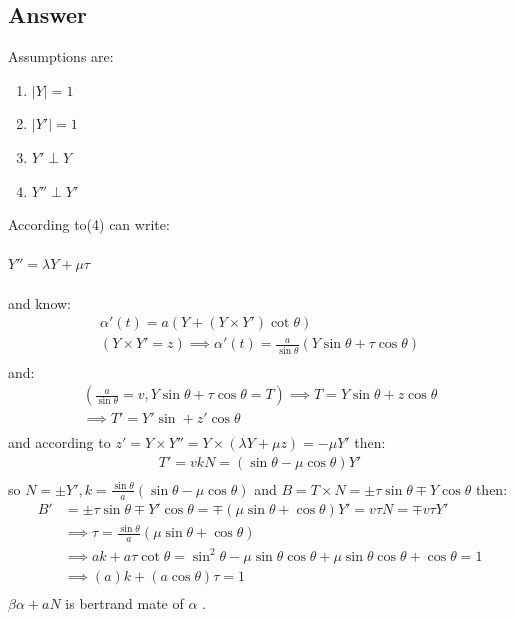 \documentclass[
	12pt, %
]{fphw}
\theoremstyle{plain}
\begin{document}
\subsection*{Answer}
Assumptions are:
\begin{enumerate}
     \item $|Y| = 1$
     \item $|Y'| = 1$
     \item $Y' \perp Y$
     \item $Y'' \perp Y'$
\end{enumerate}
According to(4) can write:\\   \\
$Y'' = \lambda Y + \mu\tau$\\  \\
and know:\\
\begin{align*}
\alpha'(t) = a(Y + (Y\times Y')\cot \theta)\\
(Y \times Y' = z) \implies \alpha'(t) = \frac{a}{\sin\theta}(Y\sin\theta + \tau\cos\theta)\\
\end{align*}
and:\\
\begin{align*}
(\frac{a}{\sin \theta} = v,Y\sin\theta +\tau\cos\theta = T)\implies T = Y\sin\theta + z\cos\theta\\
\implies T' = Y'\sin + z'\cos\theta\\
\end{align*}
and according to $z' = Y \times Y'' = Y \times(\lambda Y + \mu z) = -\mu Y'$ then:\\
\begin{align*}
 T' = vkN = (\sin\theta - \mu\cos\theta)Y'\\
\end{align*}
so $N =\pm Y', k = \frac{\sin\theta}{a}(\sin\theta - \mu \cos\theta)$ and $B = T \times N = \pm \tau\sin\theta \mp Y\cos\theta$ then:\\
\begin{align*}
 B' &= \pm \tau\sin\theta \mp Y'\cos\theta = \mp (\mu\sin\theta +\cos\theta)Y'= v\tau N = \mp v\tau Y'\\
&\implies \tau = \frac{\sin\theta}{a}(\mu\sin\theta + \cos\theta)\\
&\implies ak + a\tau\cot\theta = \sin^2\theta - \mu\sin\theta\cos\theta + \mu\sin\theta\cos\theta + \cos\theta = 1\\
&\implies (a)k + (a\cos\theta)\tau = 1\\
\end{align*}
$\beta \alpha + aN$ is bertrand mate of $\alpha$ .
\end{document}
